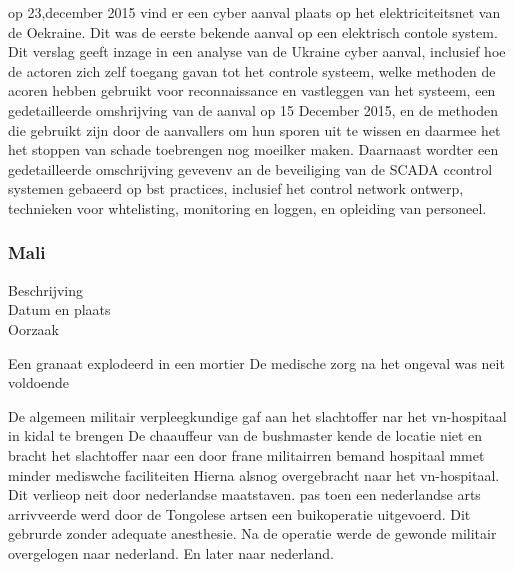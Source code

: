 op 23,december 2015  vind er een cyber aanval plaats op het elektriciteitsnet van de Oekraine. Dit was de eerste bekende aanval op een elektrisch contole  system.  Dit verslag geeft inzage in een analyse van de Ukraine cyber aanval,
inclusief hoe de actoren zich zelf toegang gavan tot het controle systeem, welke methoden de acoren hebben gebruikt voor reconnaissance en vastleggen van het systeem, een gedetailleerde omshrijving van de aanval op 15 December 2015, en de methoden die gebruikt zijn door de aanvallers om hun sporen uit te wissen en daarmee het het stoppen van schade toebrengen  nog moeilker maken. Daarnaast wordter  een gedetailleerde omschrijving gevevenv an de beveiliging van de SCADA ccontrol systemen gebaeerd op bst practices, inclusief het control network ontwerp, technieken voor whtelisting, monitoring en loggen, en  opleiding van personeel.
\cite{Whitehead2017ukrainepoweroutage}

\cite{noauthor_2022-nm}
\cite{zetter2016GridHack}



\cite{}

\subsubsection{Mali}

\begin{description}
\item[Beschrijving]
\item[Datum en plaats] 
\item[Oorzaak]
\end{description}
Een granaat explodeerd in een mortier
De medische zorg na het ongeval was neit voldoende


De algemeen militair verpleegkundige gaf aan het slachtoffer nar het vn-hospitaal in kidal te brengen
De chaauffeur van de bushmaster kende de locatie niet  en bracht het slachtoffer naar een door frane militairren bemand hospitaal mmet minder mediswche faciliteiten
Hierna alsnog overgebracht naar het vn-hospitaal.
Dit verlieop  neit door nederlandse maatstaven.
pas toen een nederlandse arts arrivveerde werd door de Tongolese artsen een buikoperatie uitgevoerd.
Dit gebrurde zonder adequate anesthesie.
Na de operatie werde de gewonde militair overgelogen naar nederland. En later naar nederland.


